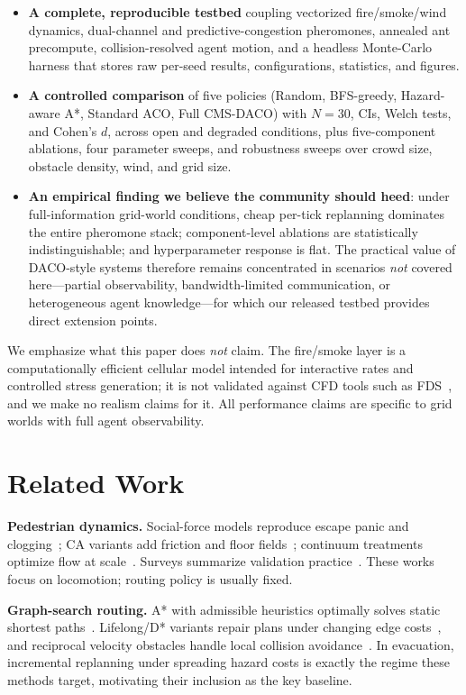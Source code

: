\documentclass[conference]{IEEEtran}
\begin{document}
\begin{itemize}
\item \textbf{A complete, reproducible testbed} coupling vectorized fire/smoke/wind dynamics, dual-channel and predictive-congestion pheromones, annealed ant precompute, collision-resolved agent motion, and a headless Monte-Carlo harness that stores raw per-seed results, configurations, statistics, and figures.
\item \textbf{A controlled comparison} of five policies (Random, BFS-greedy, Hazard-aware A*, Standard ACO, Full CMS-DACO) with $N{=}30$, CIs, Welch tests, and Cohen's $d$, across open and degraded conditions, plus five-component ablations, four parameter sweeps, and robustness sweeps over crowd size, obstacle density, wind, and grid size.
\item \textbf{An empirical finding we believe the community should heed}: under full-information grid-world conditions, cheap per-tick replanning dominates the entire pheromone stack; component-level ablations are statistically indistinguishable; and hyperparameter response is flat. The practical value of DACO-style systems therefore remains concentrated in scenarios \emph{not} covered here---partial observability, bandwidth-limited communication, or heterogeneous agent knowledge---for which our released testbed provides direct extension points.
\end{itemize}

We emphasize what this paper does \emph{not} claim. The fire/smoke layer is a computationally efficient cellular model intended for interactive rates and controlled stress generation; it is not validated against CFD tools such as FDS~\cite{mcgrattan2021fds}, and we make no realism claims for it. All performance claims are specific to grid worlds with full agent observability.

\section{Related Work}
\textbf{Pedestrian dynamics.} Social-force models reproduce escape panic and clogging~\cite{helbing2000}; CA variants add friction and floor fields~\cite{kirchner2002,burstedde2001,muramatsu1999}; continuum treatments optimize flow at scale~\cite{treuille2006}. Surveys summarize validation practice~\cite{zheng2009}. These works focus on locomotion; routing policy is usually fixed.

\textbf{Graph-search routing.} A* with admissible heuristics optimally solves static shortest paths~\cite{hart1968}. Lifelong/D* variants repair plans under changing edge costs~\cite{koenig2002,stentz1994}, and reciprocal velocity obstacles handle local collision avoidance~\cite{vandenbergen2011}. In evacuation, incremental replanning under spreading hazard costs is exactly the regime these methods target, motivating their inclusion as the key baseline.
\end{document}

